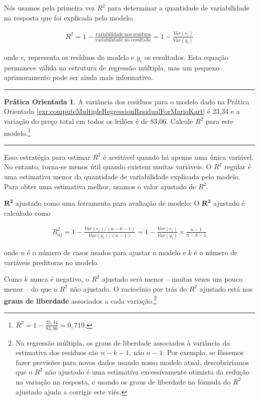 \documentclass[
]{book}
\theoremstyle{definition}
\theoremstyle{definition}
\theoremstyle{definition}
\newtheorem{exercise}{Prática Orientada}[chapter]
\theoremstyle{definition}
\theoremstyle{remark}
\begin{document}
Nós usamos pela primeira vez \(R^2\) para determinar a quantidade de variabilidade na resposta que foi explicada pelo modelo:

\begin{align*}
R^2 = 1 - \frac{\text{variabilidade nos resíduos}}{\text{variabilidade no resultado}}
    = 1 - \frac{Var(e_i)}{Var(y_i)}
\end{align*}

onde \(e_i\) representa os resíduos do modelo e \(y_i\) os resultados. Esta equação permanece válida na estrutura de regressão múltipla, mas um pequeno aprimoramento pode ser ainda mais informativo.

\begin{center}\rule{0.5\linewidth}{0.5pt}\end{center}

\begin{exercise}
\protect\hypertarget{exr:computeUnadjustedR2ForAllPredictorsInMarioKart}{}{\label{exr:computeUnadjustedR2ForAllPredictorsInMarioKart} }A variância dos resíduos para o modelo dado na Prática Orientada \ref{exr:computeMultipleRegressionResidualForMarioKart} é 23,34 e a variação do preço total em todos os leilões é de 83,06. Calcule \(R^2\) para este modelo.\footnote{\(R^2 = 1 - \frac{23,34}{83,06} = 0,719\).}
\end{exercise}

\begin{center}\rule{0.5\linewidth}{0.5pt}\end{center}

Essa estratégia para estimar \(R^2\) é aceitável quando há apenas uma única variável. No entanto, torna-se menos útil quando existem muitas variáveis. O \(R^2\) regular é uma estimativa menor da quantidade de variabilidade explicada pelo modelo. Para obter uma estimativa melhor, usamos o valor ajustado de \(R^2\).

\(\mathbf{R^2}\) ajustado como uma ferramenta para avaliação de modelo: O \(\mathbf{R^2}\) ajustado é calculado como

\begin{align*}
R_{aj}^{2} = 1-\frac{Var(e_i) / (n-k-1)}{Var(y_i) / (n-1)}
    = 1-\frac{Var(e_i)}{Var(y_i)} \times \frac{n-1}{n-k-1}
\end{align*}

onde \(n\) é o número de casos usados para ajustar o modelo e \(k\) é o número de variáveis preditoras no modelo.

Como \(k\) nunca é negativo, o \(R^2\) ajustado será menor -- muitas vezes um pouco menor -- do que o \(R^2\) não ajustado. O raciocínio por trás do \(R^2\) ajustado está nos \textbf{graus de liberdade} associados a cada variação.\footnote{Na regressão múltipla, os graus de liberdade associados à variância da estimativa dos resíduos são \(n-k-1\), não \(n-1\). Por exemplo, se fôssemos fazer previsões para novos dados usando nosso modelo atual, descobriríamos que o \(R^2\) não ajustado é uma estimativa excessivamente otimista da redução na variação na resposta, e usando os graus de liberdade na fórmula do \(R^2\) ajustado ajuda a corrigir este viés.}
\end{document}
